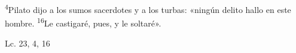 \documentclass[../../rosario.tex]{subfiles}
\begin{document}
    \textsuperscript{4}Pilato dijo a los sumos sacerdotes y a los turbas: «ningún delito hallo en este hombre. \textsuperscript{16}Le castigaré, pues, y le soltaré».
    \begin{flushright}
    Lc. 23, 4, 16
    \end{flushright}
\end{document}
